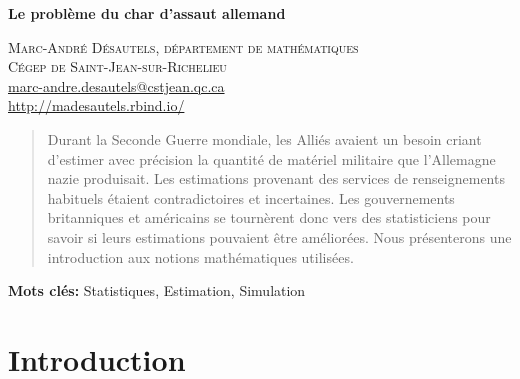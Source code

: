 \documentclass[10pt]{article}
\begin{document}


\renewcommand{\tablename}{\textsc{Tableau}}

\begin{center}
\textsf{\LARGE \textbf{Le problème du char d'assaut allemand}}
\end{center}

\begin{flushright}
\textsc{Marc-André Désautels, département de mathématiques} \\
\textsc{Cégep de Saint-Jean-sur-Richelieu} \\
\href{mailto:marc-andre.desautels@cstjean.qc.ca}{marc-andre.desautels@cstjean.qc.ca} \\
\href{http://madesautels.rbind.io/}{http://madesautels.rbind.io/}
\end{flushright}


\baselineskip


\begin{abstract}

Durant la Seconde Guerre mondiale, les Alliés avaient un besoin criant
d'estimer avec précision la quantité de matériel militaire que
l'Allemagne nazie produisait. Les estimations provenant des services de
renseignements habituels étaient contradictoires et incertaines. Les
gouvernements britanniques et américains se tournèrent donc vers des
statisticiens pour savoir si leurs estimations pouvaient être
améliorées. Nous présenterons une introduction aux notions mathématiques
utilisées.

\end{abstract}

\textbf{Mots clés: } Statistiques, Estimation, Simulation

\bigskip

\hypertarget{introduction}{%
\section{\texorpdfstring{Introduction
\label{intro}}{Introduction }}\label{introduction}}
\end{document}
